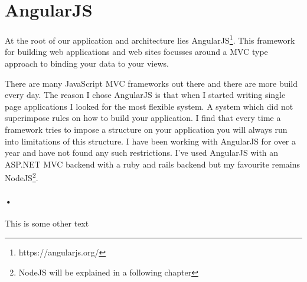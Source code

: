 


\section{AngularJS}
At the root of our application and architecture lies AngularJS\footnote{https://angularjs.org/}. This framework for building web applications and web sites focusses around a MVC type approach to binding your data to your views. 

There are many JavaScript MVC frameworks out there and there are more build every day. The reason I chose AngularJS is that when I started writing single page applications I looked for the most flexible system. A system which did not superimpose rules on how to build your application. I find that every time a framework tries to impose a structure on your application you will always run into limitations of this structure. I have been working with AngularJS for over a year and have not found any such restrictions. I’ve used AngularJS with an ASP.NET MVC backend with a ruby and rails backend but my favourite remains NodeJS\footnote{NodeJS will be explained in a following chapter}. 

\paragraph{•}
This is some other text

\pagebreak
